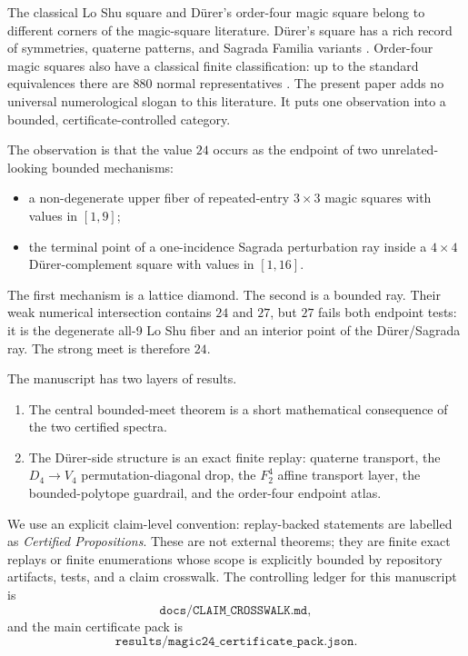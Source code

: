 \documentclass[11pt,a4paper]{article}
\theoremstyle{definition}
\theoremstyle{remark}
\newcommand{\Durer}{D\"urer\xspace}
\begin{document}
The classical Lo Shu square and \Durer's order-four magic square belong to
different corners of the magic-square literature.  \Durer's square has a rich
record of symmetries, quaterne patterns, and Sagrada Familia variants
\cite{mathworldDurer,maritzSagrada,trenklerMelancholic,sudberyTesseract}.
Order-four magic squares also have a classical finite classification: up to
the standard equivalences there are \(880\) normal representatives
\cite{ollerenshawBondi}.  The present paper adds no universal numerological
slogan to this literature.  It puts one observation into a bounded,
certificate-controlled category.

The observation is that the value \(24\) occurs as the endpoint of two
unrelated-looking bounded mechanisms:
\begin{itemize}[leftmargin=*]
\item a non-degenerate upper fiber of repeated-entry \(3\times3\) magic
  squares with values in \([1,9]\);
\item the terminal point of a one-incidence Sagrada perturbation ray inside a
  \(4\times4\) \Durer-complement square with values in \([1,16]\).
\end{itemize}
The first mechanism is a lattice diamond.  The second is a bounded ray.  Their
weak numerical intersection contains \(24\) and \(27\), but \(27\) fails both
endpoint tests: it is the degenerate all-9 Lo Shu fiber and an interior point
of the \Durer/Sagrada ray.  The strong meet is therefore \(24\).

The manuscript has two layers of results.
\begin{enumerate}[label=\textbf{(\alph*)},leftmargin=*]
\item The central bounded-meet theorem is a short mathematical consequence of
  the two certified spectra.
\item The \Durer-side structure is an exact finite replay: quaterne transport,
  the \(D_4\to V_4\) permutation-diagonal drop, the \(F_2^4\) affine transport
  layer, the bounded-polytope guardrail, and the order-four endpoint atlas.
\end{enumerate}
We use an explicit claim-level convention: replay-backed statements are
labelled as \emph{Certified Propositions}.  These are not external theorems;
they are finite exact replays or finite enumerations whose scope is explicitly
bounded by repository artifacts, tests, and a claim crosswalk.  The controlling
ledger for this manuscript is
\[
\texttt{docs/CLAIM\_CROSSWALK.md},
\]
and the main certificate pack is
\[
\texttt{results/magic24\_certificate\_pack.json}.
\]
\end{document}
